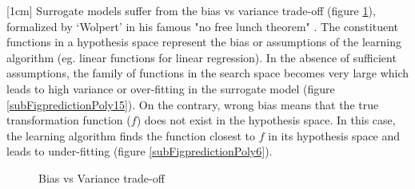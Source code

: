 [1cm]
Surrogate models suffer from the bias vs variance trade-off (figure \ref{figBiasVsVariance}), formalized by `Wolpert' in his famous "no free lunch theorem" \cite{wolpert1997no}. The constituent functions in a hypothesis space represent the bias or assumptions of the learning algorithm (eg. linear functions for linear regression). In the absence of sufficient assumptions, the family of functions in the search space becomes very large which leads to high variance or over-fitting in the surrogate model (figure \ref{subFigpredictionPoly15}). On the contrary, wrong bias means that the true transformation function ($f$) does not exist in the hypothesis space. In this case, the learning algorithm finds the function closest to $f$ in its hypothesis space and leads to under-fitting (figure \ref{subFigpredictionPoly6}).

\begin{figure}[!ht]
  \centering
    \quad
{}\quad
  \quad
       \caption{Bias vs Variance trade-off}
       \label{figBiasVsVariance}
\end{figure}



